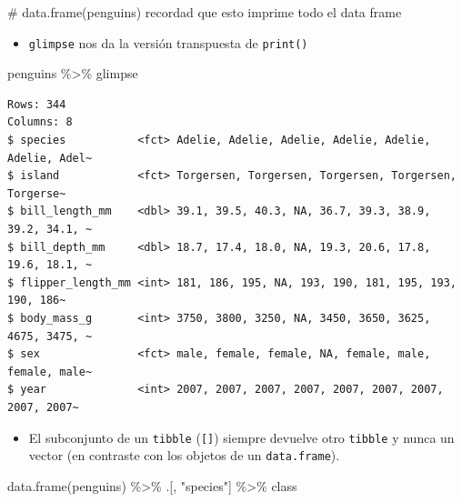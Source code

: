 \documentclass[
  letterpaper,
  DIV=11,
  numbers=noendperiod]{scrreprt}
\newenvironment{Shaded}{\begin{snugshade}}{\end{snugshade}}
\newcommand{\CommentTok}[1]{\textcolor[rgb]{0.37,0.37,0.37}{#1}}
\newcommand{\FunctionTok}[1]{\textcolor[rgb]{0.28,0.35,0.67}{#1}}
\newcommand{\NormalTok}[1]{\textcolor[rgb]{0.00,0.23,0.31}{#1}}
\newcommand{\SpecialCharTok}[1]{\textcolor[rgb]{0.37,0.37,0.37}{#1}}
\newcommand{\StringTok}[1]{\textcolor[rgb]{0.13,0.47,0.30}{#1}}
\providecommand{\tightlist}{%
  \setlength{\itemsep}{0pt}\setlength{\parskip}{0pt}}\usepackage{longtable,booktabs,array}
\begin{document}
\begin{Shaded}
\begin{Highlighting}[]
\CommentTok{\# data.frame(penguins) recordad que esto imprime todo el data frame}
\end{Highlighting}
\end{Shaded}

\begin{itemize}
\tightlist
\item
  \texttt{glimpse} nos da la versión transpuesta de \texttt{print()}
\end{itemize}

\begin{Shaded}
\begin{Highlighting}[]
\NormalTok{penguins }\SpecialCharTok{\%\textgreater{}\%}\NormalTok{ glimpse}
\end{Highlighting}
\end{Shaded}

\begin{verbatim}
Rows: 344
Columns: 8
$ species           <fct> Adelie, Adelie, Adelie, Adelie, Adelie, Adelie, Adel~
$ island            <fct> Torgersen, Torgersen, Torgersen, Torgersen, Torgerse~
$ bill_length_mm    <dbl> 39.1, 39.5, 40.3, NA, 36.7, 39.3, 38.9, 39.2, 34.1, ~
$ bill_depth_mm     <dbl> 18.7, 17.4, 18.0, NA, 19.3, 20.6, 17.8, 19.6, 18.1, ~
$ flipper_length_mm <int> 181, 186, 195, NA, 193, 190, 181, 195, 193, 190, 186~
$ body_mass_g       <int> 3750, 3800, 3250, NA, 3450, 3650, 3625, 4675, 3475, ~
$ sex               <fct> male, female, female, NA, female, male, female, male~
$ year              <int> 2007, 2007, 2007, 2007, 2007, 2007, 2007, 2007, 2007~
\end{verbatim}

\begin{itemize}
\tightlist
\item
  El subconjunto de un \texttt{tibble} (\texttt{{[}{]}}) siempre
  devuelve otro \texttt{tibble} y nunca un vector (en contraste con los
  objetos de un \texttt{data.frame}).
\end{itemize}

\begin{Shaded}
\begin{Highlighting}[]
\FunctionTok{data.frame}\NormalTok{(penguins) }\SpecialCharTok{\%\textgreater{}\%}\NormalTok{ .[, }\StringTok{"species"}\NormalTok{] }\SpecialCharTok{\%\textgreater{}\%}\NormalTok{ class}
\end{Highlighting}
\end{Shaded}
\end{document}
